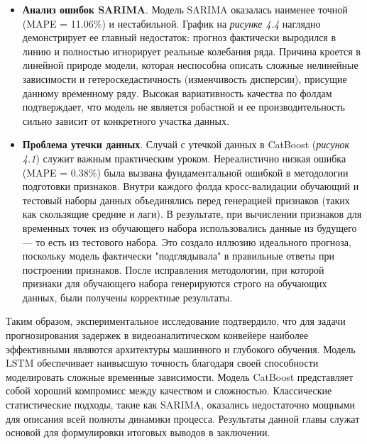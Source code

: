 \begin{itemize}
    \item \textbf{Анализ ошибок SARIMA}. Модель SARIMA оказалась наименее точной (MAPE = 11.06\%) и нестабильной. График на \textit{рисунке 4.4} наглядно демонстрирует ее главный недостаток: прогноз фактически выродился в линию и полностью игнорирует реальные колебания ряда. Причина кроется в линейной природе модели, которая неспособна описать сложные нелинейные зависимости и гетероскедастичность (изменчивость дисперсии), присущие данному временному ряду. Высокая вариативность качества по фолдам подтверждает, что модель не является робастной и ее производительность сильно зависит от конкретного участка данных.

    \item \textbf{Проблема утечки данных}. Случай с утечкой данных в CatBoost (\textit{рисунок 4.1}) служит важным практическим уроком. Нереалистично низкая ошибка (MAPE = 0.38\%) была вызвана фундаментальной ошибкой в методологии подготовки признаков. Внутри каждого фолда кросс-валидации обучающий и тестовый наборы данных объединялись перед генерацией признаков (таких как скользящие средние и лаги). В результате, при вычислении признаков для временных точек из обучающего набора использовались данные из будущего — то есть из тестового набора. Это создало иллюзию идеального прогноза, поскольку модель фактически "подглядывала" в правильные ответы при построении признаков. После исправления методологии, при которой признаки для обучающего набора генерируются строго на обучающих данных, были получены корректные результаты.
\end{itemize}

\hspace*{1.25cm}Таким образом, экспериментальное исследование подтвердило, что для задачи прогнозирования задержек в видеоаналитическом конвейере наиболее эффективными являются архитектуры машинного и глубокого обучения. Модель LSTM обеспечивает наивысшую точность благодаря своей способности моделировать сложные временные зависимости. Модель CatBoost представляет собой хороший компромисс между качеством и сложностью. Классические статистические подходы, такие как SARIMA, оказались недостаточно мощными для описания всей полноты динамики процесса. Результаты данной главы служат основой для формулировки итоговых выводов в заключении.
